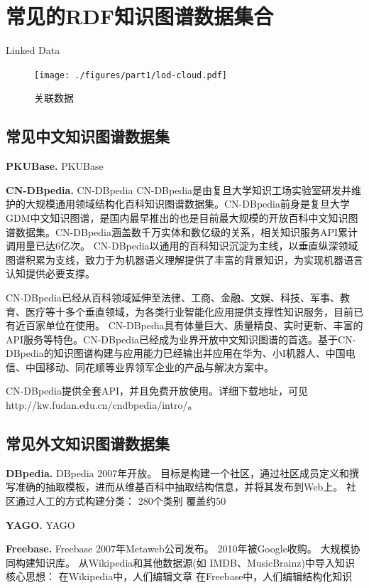 \section{常见的RDF知识图谱数据集合}\label{sec:RDFDatasets}

Linked Data

\begin{figure}[h]
\begin{center}
   \texttt{[image: ./figures/part1/lod-cloud.pdf]}
    \caption{关联数据}
   \label{fig:linkeddata}
\end{center}
\end{figure}


\subsection{常见中文知识图谱数据集}\label{sec:ChineseDatasets}
\textbf{PKUBase.}
PKUBase

\textbf{CN-DBpedia.}
CN-DBpedia\cite{DBLP:CNDBpedia} CN-DBpedia是由复旦大学知识工场实验室研发并维护的大规模通用领域结构化百科知识图谱数据集。CN-DBpedia前身是复旦大学GDM中文知识图谱，是国内最早推出的也是目前最大规模的开放百科中文知识图谱数据集。CN-DBpedia涵盖数千万实体和数亿级的关系，相关知识服务API累计调用量已达6亿次。
CN-DBpedia以通用的百科知识沉淀为主线，以垂直纵深领域图谱积累为支线，致力于为机器语义理解提供了丰富的背景知识，为实现机器语言认知提供必要支撑。

CN-DBpedia已经从百科领域延伸至法律、工商、金融、文娱、科技、军事、教育、医疗等十多个垂直领域，为各类行业智能化应用提供支撑性知识服务，目前已有近百家单位在使用。
CN-DBpedia具有体量巨大、质量精良、实时更新、丰富的API服务等特色。CN-DBpedia已经成为业界开放中文知识图谱的首选。基于CN-DBpedia的知识图谱构建与应用能力已经输出并应用在华为、小I机器人、中国电信、中国移动、同花顺等业界领军企业的产品与解决方案中。

CN-DBpedia提供全套API，并且免费开放使用。详细下载地址，可见http://kw.fudan.edu.cn/cndbpedia/intro/。



\subsection{常见外文知识图谱数据集}\label{sec:EnglishDatasets}
\textbf{DBpedia.}
DBpedia\cite{DBLP:DBpedia}
2007年开放。
目标是构建一个社区，通过社区成员定义和撰写准确的抽取模板，进而从维基百科中抽取结构信息，并将其发布到Web上。
社区通过人工的方式构建分类：
280个类别
覆盖约50%


\textbf{YAGO.}
YAGO\cite{DBLP:YAGO,DBLP:YAGO2,DBLP:YAGO3}

\textbf{Freebase.}
Freebase\cite{url:Freebase}
2007年Metaweb公司发布。
2010年被Google收购。
大规模协同构建知识库。
从Wikipedia和其他数据源(如 IMDB、MusicBrainz)中导入知识
核心思想：
在Wikipedia中，人们编辑文章
在Freebase中，人们编辑结构化知识


